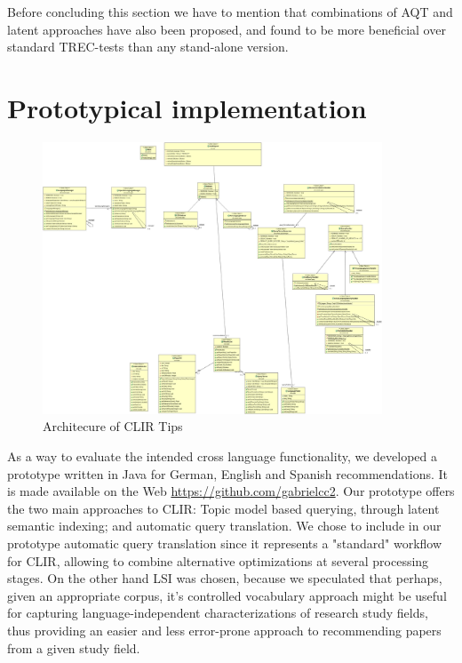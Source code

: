 \documentclass{llncs}
\begin{document}
Before concluding this section we have to mention that combinations of AQT and latent approaches have also been proposed, and found to be more beneficial over standard TREC-tests than any stand-alone version\cite{roth2010combining}. 

\section{Prototypical implementation}

\begin{figure}[h!]
  \centering
      \includegraphics[width=0.9\textwidth]{CLIRTipsUML.jpg}
  \caption{Architecure of CLIR Tips}
\label{fig:ClirTips}
\end{figure}

As a way to evaluate the intended cross language functionality, we developed a prototype written in Java for German, English and Spanish recommendations. It is made available on the Web \url{https://github.com/gabrielcc2}. Our prototype offers the two main approaches to CLIR: Topic model based querying, through latent semantic indexing; and automatic query translation. We chose to include in our prototype automatic query translation since it represents a "standard" workflow for CLIR, allowing to combine alternative optimizations at several processing stages. On the other hand LSI was chosen, because we speculated that perhaps, given an appropriate corpus, it's controlled vocabulary approach might be useful for capturing language-independent characterizations of research study fields, thus providing an easier and less error-prone approach to recommending papers from a given study field. 
\end{document}
